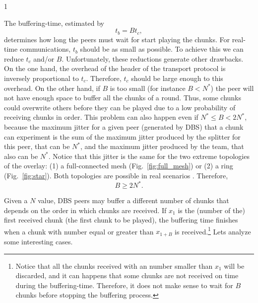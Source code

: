 1%


\label{sec:buffering_time}
The buffering-time, estimated by
\begin{equation}
  \label{eq:t_b}
  t_b = Bt_c,  %
\end{equation}
determines how long the peers must wait for start playing the
chunks. For real-time communications, $t_b$ should be as small as
possible. To achieve this we can reduce $t_c$ and/or
$B$. Unfortunately, these reductions generate other drawbacks. On
the one hand, the overhead of the header of the transport protocol is
inversely proportional to $t_c$. Therefore, $t_c$ should be large
enough to  this overhead. On the other hand, if $B$
is too small (for instance $B<N^*$) the peer will not have enough
space to buffer all the chunks of a round. Thus, some chunks could
overwrite others before they can be played due to a low probability
of receiving chunks in order. This problem can also
happen even if $N^*\leq B<2N^*$, because the maximum jitter for a
given peer (generated by DBS) that a chunk can experiment is the sum
of the maximum jitter produced by the splitter for this peer, that can
be $N^*$, and the maximum jitter produced by the team, that also can
be $N^*$. Notice that this jitter is the same for the two extreme
topologies of the overlay: (1) a full-connected mesh
(Fig.~\ref{fig:full_mesh}) or (2) a ring (Fig.~\ref{fig:star}). Both topologies are possible in real scenarios . Therefore, 
\begin{equation}
  \label{eq:minimum_B}
  B\ge 2N^*.
\end{equation}

Given a $N$ value, DBS peers may buffer a different number of chunks
that depends on the order in which chunks are received. If $x_1$ is
the (number of the) first received chunk (the first chunk to be
played), the buffering time finishes when a chunk with number equal or
greater than $x_{1+B}$ is received.\footnote{Notice that all the
  chunks received with an number smaller than $x_1$ will be discarded,
  and it can happens that some chunks
  are not received on time during the buffering-time. Therefore, it does not make sense to wait
  for $B$ chunks before stopping the buffering process.} Lets analyze
some interesting cases.

